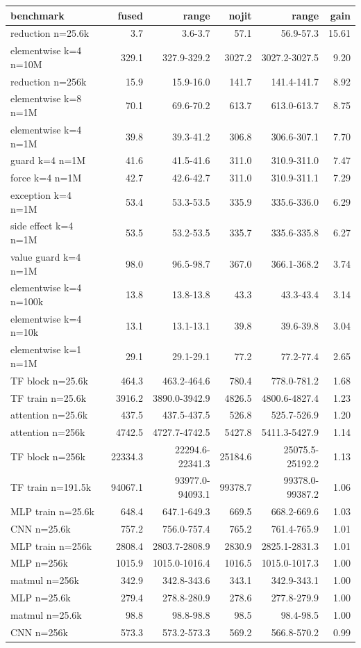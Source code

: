 \begin{tabular}{lrrrrr}
\toprule
benchmark & fused & range & nojit & range & gain \\
\midrule
reduction n=25.6k & 3.7 & 3.6-3.7 & 57.1 & 56.9-57.3 & 15.61 \\
elementwise k=4 n=10M & 329.1 & 327.9-329.2 & 3027.2 & 3027.2-3027.5 & 9.20 \\
reduction n=256k & 15.9 & 15.9-16.0 & 141.7 & 141.4-141.7 & 8.92 \\
elementwise k=8 n=1M & 70.1 & 69.6-70.2 & 613.7 & 613.0-613.7 & 8.75 \\
elementwise k=4 n=1M & 39.8 & 39.3-41.2 & 306.8 & 306.6-307.1 & 7.70 \\
guard k=4 n=1M & 41.6 & 41.5-41.6 & 311.0 & 310.9-311.0 & 7.47 \\
force k=4 n=1M & 42.7 & 42.6-42.7 & 311.0 & 310.9-311.1 & 7.29 \\
exception k=4 n=1M & 53.4 & 53.3-53.5 & 335.9 & 335.6-336.0 & 6.29 \\
side effect k=4 n=1M & 53.5 & 53.2-53.5 & 335.7 & 335.6-335.8 & 6.27 \\
value guard k=4 n=1M & 98.0 & 96.5-98.7 & 367.0 & 366.1-368.2 & 3.74 \\
elementwise k=4 n=100k & 13.8 & 13.8-13.8 & 43.3 & 43.3-43.4 & 3.14 \\
elementwise k=4 n=10k & 13.1 & 13.1-13.1 & 39.8 & 39.6-39.8 & 3.04 \\
elementwise k=1 n=1M & 29.1 & 29.1-29.1 & 77.2 & 77.2-77.4 & 2.65 \\
TF block n=25.6k & 464.3 & 463.2-464.6 & 780.4 & 778.0-781.2 & 1.68 \\
TF train n=25.6k & 3916.2 & 3890.0-3942.9 & 4826.5 & 4800.6-4827.4 & 1.23 \\
attention n=25.6k & 437.5 & 437.5-437.5 & 526.8 & 525.7-526.9 & 1.20 \\
attention n=256k & 4742.5 & 4727.7-4742.5 & 5427.8 & 5411.3-5427.9 & 1.14 \\
TF block n=256k & 22334.3 & 22294.6-22341.3 & 25184.6 & 25075.5-25192.2 & 1.13 \\
TF train n=191.5k & 94067.1 & 93977.0-94093.1 & 99378.7 & 99378.0-99387.2 & 1.06 \\
MLP train n=25.6k & 648.4 & 647.1-649.3 & 669.5 & 668.2-669.6 & 1.03 \\
CNN n=25.6k & 757.2 & 756.0-757.4 & 765.2 & 761.4-765.9 & 1.01 \\
MLP train n=256k & 2808.4 & 2803.7-2808.9 & 2830.9 & 2825.1-2831.3 & 1.01 \\
MLP n=256k & 1015.9 & 1015.0-1016.4 & 1016.5 & 1015.0-1017.3 & 1.00 \\
matmul n=256k & 342.9 & 342.8-343.6 & 343.1 & 342.9-343.1 & 1.00 \\
MLP n=25.6k & 279.4 & 278.8-280.9 & 278.6 & 277.8-279.9 & 1.00 \\
matmul n=25.6k & 98.8 & 98.8-98.8 & 98.5 & 98.4-98.5 & 1.00 \\
CNN n=256k & 573.3 & 573.2-573.3 & 569.2 & 566.8-570.2 & 0.99 \\
\bottomrule
\end{tabular}
